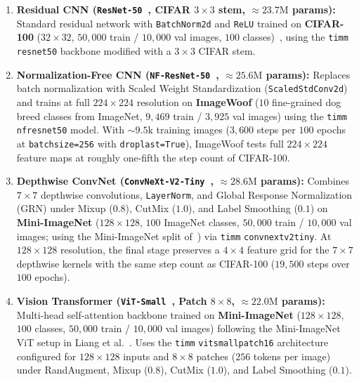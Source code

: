 \documentclass[11pt,a4paper]{article}
\renewcommand{\_}{\origunderscore\allowbreak}
\begin{document}
\begin{enumerate}[label=\textbf{V-A\arabic*.}, leftmargin=3.2em, itemsep=0.45em]
    \item \textbf{Residual CNN (\texttt{ResNet-50}~\cite{he2016resnet}, CIFAR $3 \times 3$ stem, $\approx 23.7\text{M}$ params):} Standard residual network with \texttt{BatchNorm2d} and \texttt{ReLU} trained on \textbf{CIFAR-100} ($32 \times 32$, $50,000$ train / $10,000$ val images, $100$ classes)~\cite{loshchilov2019adamw,zhuang2020adabelief,zhang2019lookahead}, using the \texttt{timm} \texttt{resnet50} backbone modified with a $3 \times 3$ CIFAR stem.

    \item \textbf{Normalization-Free CNN (\texttt{NF-ResNet-50}~\cite{brock2021nfnet}, $\approx 25.6\text{M}$ params):} Replaces batch normalization with Scaled Weight Standardization (\texttt{ScaledStdConv2d}) and trains at full $224 \times 224$ resolution on \textbf{ImageWoof} ($10$ fine-grained dog breed classes from ImageNet, $9,469$ train / $3,925$ val images) using the \texttt{timm} \texttt{nf\_resnet50} model. With $\sim 9.5\text{k}$ training images ($3,600$ steps per $100$ epochs at \texttt{batch\_size=256} with \texttt{drop\_last=True}), ImageWoof tests full $224 \times 224$ feature maps at roughly one-fifth the step count of CIFAR-100.

    \item \textbf{Depthwise ConvNet (\texttt{ConvNeXt-V2-Tiny}~\cite{woo2023convnextv2}, $\approx 28.6\text{M}$ params):} Combines $7 \times 7$ depthwise convolutions, \texttt{LayerNorm}, and Global Response Normalization (GRN) under Mixup ($0.8$), CutMix ($1.0$), and Label Smoothing ($0.1$) on \textbf{Mini-ImageNet} ($128 \times 128$, $100$ ImageNet classes, $50,000$ train / $10,000$ val images; using the Mini-ImageNet split of~\cite{liang2026cautious}) via \texttt{timm} \texttt{convnextv2\_tiny}. At $128 \times 128$ resolution, the final stage preserves a $4 \times 4$ feature grid for the $7 \times 7$ depthwise kernels with the same step count as CIFAR-100 ($19,500$ steps over $100$ epochs).

    \item \textbf{Vision Transformer (\texttt{ViT-Small}~\cite{dosovitskiy2021vit}, Patch $8 \times 8$, $\approx 22.0\text{M}$ params):} Multi-head self-attention backbone trained on \textbf{Mini-ImageNet} ($128 \times 128$, $100$ classes, $50,000$ train / $10,000$ val images) following the Mini-ImageNet ViT setup in Liang et al.~\cite{liang2026cautious}. Uses the \texttt{timm} \texttt{vit\_small\_patch16\_224} architecture configured for $128 \times 128$ inputs and $8 \times 8$ patches ($256$ tokens per image) under RandAugment, Mixup ($0.8$), CutMix ($1.0$), and Label Smoothing ($0.1$).


\end{enumerate}
\end{document}
